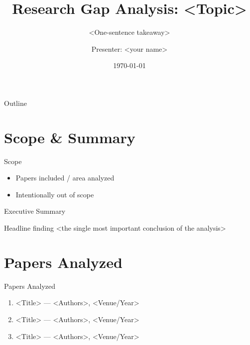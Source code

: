 \documentclass[aspectratio=169]{beamer}
\title{Research Gap Analysis: <Topic>}
\subtitle{<One-sentence takeaway>}
\author{Presenter: <your name>}
\institute{N papers analyzed}
\date{\today}
\begin{document}
\begin{frame}[plain]
  \titlepage
\end{frame}

\begin{frame}{Outline}
  \tableofcontents
\end{frame}


\section{Scope \& Summary}
\begin{frame}{Scope}
  \begin{itemize}
    \item Papers included / area analyzed
    \item Intentionally out of scope
  \end{itemize}
\end{frame}

\begin{frame}{Executive Summary}
  \begin{block}{Headline finding}
    <the single most important conclusion of the analysis>
  \end{block}
\end{frame}

\section{Papers Analyzed}
\begin{frame}{Papers Analyzed}
  \small
  \begin{enumerate}
    \item <Title> --- <Authors>, <Venue/Year>
    \item <Title> --- <Authors>, <Venue/Year>
    \item <Title> --- <Authors>, <Venue/Year>
  \end{enumerate}
\end{frame}
\end{document}
